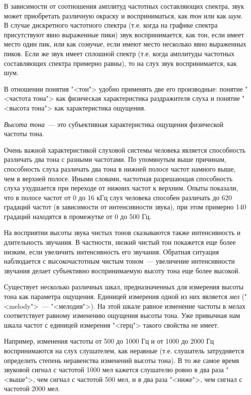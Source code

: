 \documentclass[oneside, final, 14pt]{extreport}
\begin{document}
В зависимости от соотношения амплитуд частотных составляющих спектра, звук может приобретать различную окраску и восприниматься, как {\itshape тон} или как
{\itshape шум}. В случае дискретного частотного спектра (т.е. когда на графике спектра присутствуют явно выраженные пики) звук воспринимается, как тон, если имеет место один пик, или как {\itshape созвучие}, если имеют место несколько явно выраженных пиков. Если же звук имеет сплошной спектр (т.е. когда амплитуды частотных составляющих спектра примерно равны), то на слух звук воспринимается, как шум.

В отношении понятия "<тон"> удобно применять две его производные: понятие "<частота тона"> как физическая характеристика раздражителя слуха и понятие "<высота тона"> как характеристика ощущения. 

{\itshape Высота тона}~--- это субъективная характеристика ощущения физической частоты тона.

Очень важной характеристикой слуховой системы человека является способность различать два тона с разными частотами. По упомянутым выше причинам, способность слуха различать два тона в нижней полосе частот намного выше, чем в верхней полосе. Иными словами, частотная разрешающая способность слуха ухудшается при переходе от нижних частот к верхним. Опыты показали, что в полосе частот от 0 до 16 кГц слух человека способен различать до 620 градаций частот (в зависимости от интенсивности звука), при этом примерно 140 градаций находятся в промежутке от 0 до 500 Гц.

На восприятии высоты звука чистых тонов сказываются также интенсивность и длительность звучания. В частности, низкий чистый тон покажется еще более низким, если увеличить интенсивность его звучания. Обратная ситуация наблюдается с высокочастотным чистым тоном~--- увеличение интенсивности звучания делает
субъективно воспринимаемую высоту тона еще более высокой.

Существует несколько различных шкал, предназначенных для измерения высоты тона как параметра ощущения. Единицей измерения одной из них является {\itshape мел} ("<melody">~--- "<мелодия">). На этой шкале равное изменение частоты в мелах
соответствует равному изменению ощущения высоты тона. Уже привычная нам шкала частот с единицей измерения "<герц"> такого свойства не имеет. 

Например, изменения частоты от 500 до 1000 Гц и от 1000 до 2000 Гц воспринимаются на слух слушателем, как неравные (т.е. слушатель затрудняется определить степень неравенства изменений высоты тона). В то же самое время звуковой сигнал с частотой
1000 мел кажется слушателю ровно в два раза "<выше">, чем сигнал с частотой
500 мел, и в два раза "<ниже">, чем сигнал с частотой 2000 мел.
\end{document}
